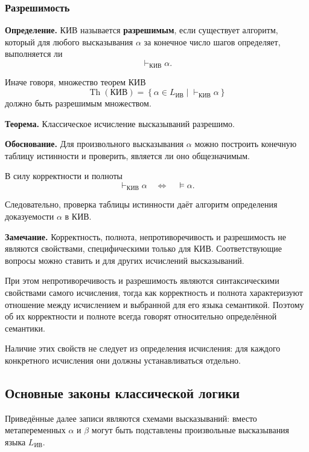\documentclass[12pt,a4paper,oneside,openany]{book}
\theoremstyle{definition}
\theoremstyle{plain}
\theoremstyle{remark}
\begin{document}
\subsubsection{Разрешимость}

\textbf{Определение.}
КИВ называется \textbf{разрешимым}, если существует алгоритм, который
для любого высказывания \(\alpha\) за конечное число шагов определяет,
выполняется ли
\[
\vdash_{\mathrm{КИВ}}\alpha.
\]

Иначе говоря, множество теорем КИВ
\[
\operatorname{Th}(\mathrm{КИВ})
=
\left\{
\alpha\in L_{\mathrm{ИВ}}
\mid
\vdash_{\mathrm{КИВ}}\alpha
\right\}
\]
должно быть разрешимым множеством.

\textbf{Теорема.}
Классическое исчисление высказываний разрешимо.

\textbf{Обоснование.}
Для произвольного высказывания \(\alpha\) можно построить конечную
таблицу истинности и проверить, является ли оно общезначимым.

В силу корректности и полноты
\[
\vdash_{\mathrm{КИВ}}\alpha
\quad\Longleftrightarrow\quad
\models\alpha.
\]

Следовательно, проверка таблицы истинности даёт алгоритм определения
доказуемости \(\alpha\) в КИВ.

\vspace{7mm}

\textbf{Замечание.}
Корректность, полнота, непротиворечивость и разрешимость не являются
свойствами, специфическими только для КИВ. Соответствующие вопросы
можно ставить и для других исчислений высказываний.

При этом непротиворечивость и разрешимость являются синтаксическими
свойствами самого исчисления, тогда как корректность и полнота
характеризуют отношение между исчислением и выбранной для его языка
семантикой. Поэтому об их корректности и полноте всегда говорят
относительно определённой семантики.

Наличие этих свойств не следует из определения исчисления:
для каждого конкретного исчисления они должны устанавливаться отдельно.



\subsection{Основные законы классической логики}

Приведённые далее записи являются схемами высказываний:
вместо метапеременных \(\alpha\) и \(\beta\) могут быть подставлены
произвольные высказывания языка \(L_{\mathrm{ИВ}}\).
\end{document}
